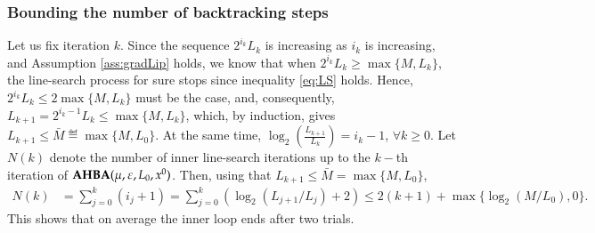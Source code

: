 \subsubsection{Bounding the number of backtracking steps}
\label{sec:backtrack1}
Let us fix iteration $k$. Since the sequence $2^{i_k} L_k $ is increasing as $i_k$ is increasing, and Assumption \ref{ass:gradLip} holds, we know that when $2^{i_k} L_k \geq \max\{M,L_k\}$, the line-search process for sure stops since inequality \eqref{eq:LS} holds. 
Hence, $2^{i_k} L_k \leq 2\max\{M,L_k\}$ must be the case, and, consequently, $L_{k+1} = 2^{i_k-1} L_k \leq \max\{M,L_k\}$, which, by induction, gives $L_{k+1} \leq \bar{M}\eqdef\max\{M,L_0\}$. 
At the same time, $\log_{2}\left(\frac{L_{k+1}}{L_{k}}\right)= i_{k}-1$, $\forall k\geq 0$. Let $N(k)$ denote the number of inner line-search iterations up to the $k-$th iteration of $\operatorname{\mathbf{AHBA}}(\mu,\varepsilon,L_{0},x^{0})$. Then, using that $L_{k+1} \leq \bar{M}=\max\{M,L_0\}$, 
\begin{align*}
N(k)&=\sum_{j=0}^{k}(i_{j}+1)=\sum_{j=0}^{k} (\log_{2}(L_{j+1}/L_{j})+2 ) \leq 2(k+1)+\max\{\log_{2}(M/L_{0}),0\}.
\end{align*}
This shows that on average the inner loop ends after two trials. 

